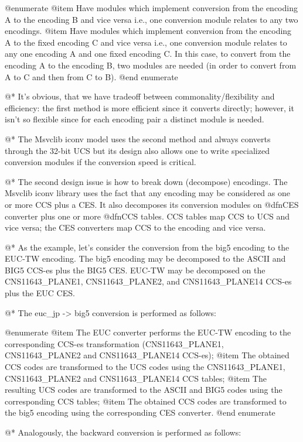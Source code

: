 @enumerate
@item
Have modules which implement conversion from the encoding A to the encoding B
and vice versa i.e., one conversion module relates to any two encodings.
@item
Have modules which implement conversion from the encoding A to the fixed
encoding C and vice versa i.e., one conversion module relates to any
one encoding A and one fixed encoding C. In this case, to convert from
the encoding A to the encoding B, two modules are needed (in order to convert
from A to C and then from C to B).
@end enumerate

@*
It's obvious, that we have tradeoff between commonality/flexibility and
efficiency: the first method is more efficient since it converts
directly; however, it isn't so flexible since for each
encoding pair a distinct module is needed.

@*
The Msvclib iconv model uses the second method and always converts through the 32-bit
UCS but its design also allows one to write specialized conversion
modules if the conversion speed is critical.

@*
The second design issue is how to break down (decompose) encodings.
The Msvclib iconv library uses the fact that any encoding may be
considered as one or more CCS plus a CES. It also decomposes its
conversion modules on @dfn{CES converter} plus one or more @dfn{CCS
tables}. CCS tables map CCS to UCS and vice versa; the CES converters
map CCS to the encoding and vice versa.

@*
As the example, let's consider the conversion from the big5 encoding to
the EUC-TW encoding. The big5 encoding may be decomposed to the ASCII and BIG5
CCS-es plus the BIG5 CES. EUC-TW may be decomposed on the CNS11643_PLANE1, CNS11643_PLANE2,
and CNS11643_PLANE14 CCS-es plus the EUC CES.

@*
The euc_jp -> big5 conversion is performed as follows:

@enumerate
@item
The EUC converter performs the EUC-TW encoding to the corresponding CCS-es
transformation (CNS11643_PLANE1, CNS11643_PLANE2 and CNS11643_PLANE14
CCS-es);
@item
The obtained CCS codes are transformed to the UCS codes using the CNS11643_PLANE1,
CNS11643_PLANE2 and CNS11643_PLANE14 CCS tables;
@item
The resulting UCS codes are transformed to the ASCII and BIG5 codes using
the corresponding CCS tables;
@item
The obtained CCS codes are transformed to the big5 encoding using the corresponding
CES converter.
@end enumerate

@*
Analogously, the backward conversion is performed as follows:


